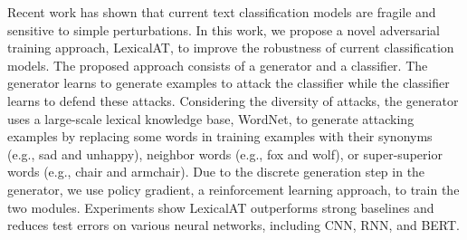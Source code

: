 Recent work has shown that current text classification models are fragile and sensitive to simple perturbations. In this work, we propose a novel adversarial training approach, LexicalAT, to improve the robustness of current classification models. The proposed approach consists of a generator and a classifier. The generator learns to generate examples to attack the classifier while the classifier learns to defend these attacks. Considering the diversity of attacks, the generator uses a large-scale lexical knowledge base, WordNet, to generate attacking examples by replacing some words in training examples with their synonyms  (e.g., sad and unhappy), neighbor words (e.g., fox and wolf), or super-superior words (e.g., chair and armchair). Due to the discrete generation step in the generator, we use policy gradient, a reinforcement learning approach, to train the two modules.  Experiments show LexicalAT outperforms strong baselines and reduces test errors on various neural networks, including CNN, RNN, and BERT.